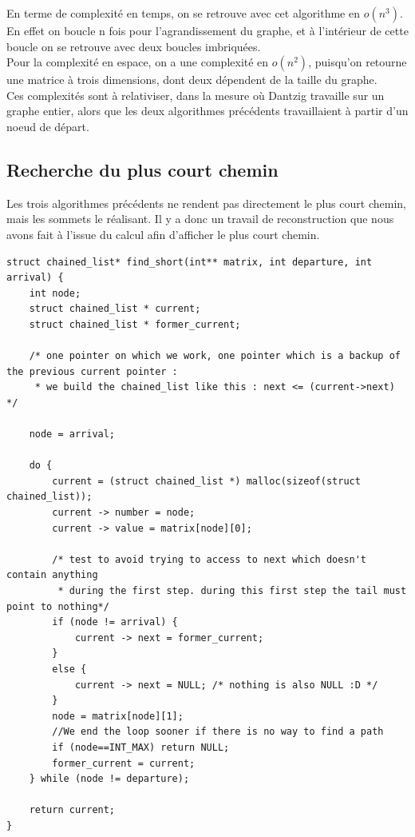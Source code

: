 \documentclass[a4paper,12pt,final] {article}
\begin{document}
En terme de complexité en temps, on se retrouve avec cet algorithme en $o(n^{3})$. En effet on boucle n fois pour l'agrandissement du graphe, et à l'intérieur de cette boucle on se retrouve avec deux boucles imbriquées.\\

Pour la complexité en espace, on a une complexité en $o(n^{2})$, puisqu'on retourne une matrice à trois dimensions, dont deux dépendent de la taille du graphe.\\

Ces complexités sont à relativiser, dans la mesure où Dantzig travaille sur un graphe entier, alors que les deux algorithmes précédents travaillaient à partir d'un noeud de départ.\\

\subsection{Recherche du plus court chemin}

Les trois algorithmes précédents ne rendent pas directement le plus court chemin, mais les sommets le réalisant. Il y a donc un travail de reconstruction que nous avons fait à l'issue du calcul afin d'afficher le plus court chemin.\\

\begin{lstlisting}
struct chained_list* find_short(int** matrix, int departure, int arrival) {
	int node;
	struct chained_list * current;
	struct chained_list * former_current;
	
	/* one pointer on which we work, one pointer which is a backup of the previous current pointer :
	 * we build the chained_list like this : next <= (current->next) */
	
	node = arrival;
	
	do {
		current = (struct chained_list *) malloc(sizeof(struct chained_list));
		current -> number = node;
		current -> value = matrix[node][0];
		
		/* test to avoid trying to access to next which doesn't contain anything 
		 * during the first step. during this first step the tail must point to nothing*/
		if (node != arrival) {
			current -> next = former_current;
		}
		else {
			current -> next = NULL; /* nothing is also NULL :D */
		}
		node = matrix[node][1];
		//We end the loop sooner if there is no way to find a path
		if (node==INT_MAX) return NULL;
		former_current = current;
	} while (node != departure);
	
	return current;
}
\end{lstlisting}
\end{document}
